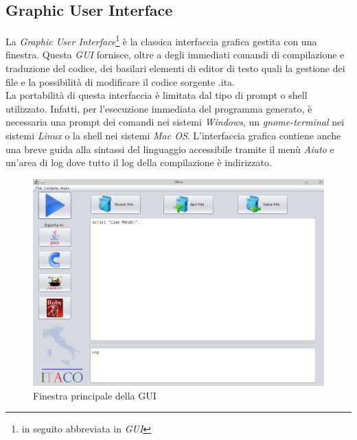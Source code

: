 \documentclass[11pt, a4paper, twoside, notitlepage]{report}
\begin{document}
\subsection{Graphic User Interface}
La \emph{Graphic User Interface}\footnote{in seguito abbreviata in \emph{GUI}} è
la classica interfaccia grafica gestita con una finestra. Questa \emph{GUI}
fornisce, oltre a degli immediati comandi di compilazione e traduzione del
codice, dei basilari elementi di editor di testo quali la gestione dei file e
la possibilità di modificare il codice sorgente .ita.
\\La portabilità di questa interfaccia è limitata dal tipo di prompt o shell
utilizzato. Infatti, per l'esecuzione immediata del programma generato, è
necessaria una prompt dei comandi nei sistemi \emph{Windows}, un
\emph{gnome-terminal} nei sistemi \emph{Linux} o la shell nei sistemi
\emph{Mac OS}.
L'interfaccia grafica contiene anche una breve guida alla sintassi del
linguaggio accessibile tramite il menù \emph{Aiuto} e un'area di log dove tutto
il log della compilazione è indirizzato.

\begin{figure}[h] \hspace*{30pt} 
\includegraphics[scale=0.5]{img/gui_itaco.png}
\caption{Finestra principale della GUI}
\end{figure}
\end{document}
